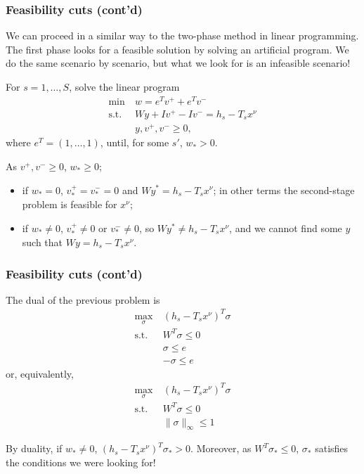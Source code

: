 \documentclass{beamer}
\begin{document}
\begin{frame}
\frametitle{Feasibility cuts (cont'd)}

We can proceed in a similar way to the two-phase method in linear programming.
The first phase looks for a feasible solution by solving an artificial program.
We do the same scenario by scenario, but what we look for is an infeasible scenario!

\mbox{}

For $s = 1,\ldots,S$, solve the linear program
\begin{align*}
\min\ & w = e^Tv^+ + e^Tv^- \\
\mbox{s.t. } & Wy + Iv^+ - Iv^- = h_s - T_sx^{\nu} \\
& y, v^+, v^- \geq 0,
\end{align*}
where $e^T = (1,\ldots,1)$, until, for some $s'$, %
$w_* > 0$.

\mbox{}

As $v^+, v^- \geq 0$, $w_* \geq 0$;
\begin{itemize}
\item 
if $w_* = 0$, $v^+_* = v^-_* = 0$ and $Wy^* = h_s - T_sx^{\nu}$; in other terms the second-stage problem is feasible for $x^{\nu}$;
\item
if $w_* \ne 0$, $v^+_* \ne 0$ or $v^-_* \ne 0$, so $Wy^* \ne h_s - T_sx^{\nu}$, and we cannot find some $y$ such that $Wy = h_s - T_sx^{\nu}$.
\end{itemize}
	
\end{frame}

\begin{frame}
\frametitle{Feasibility cuts (cont'd)}

The dual of the previous problem is
\begin{align*}
\max_{\sigma}\ & (h_s - T_sx^{\nu})^T\sigma \\
\mbox{s.t. } & W^T \sigma \leq 0 \\
& \sigma \leq e \\
& -\sigma \leq e
\end{align*}
or, equivalently,
\begin{align*}
\max_{\sigma}\ & (h_s - T_sx^{\nu})^T\sigma \\
\mbox{s.t. } & W^T \sigma \leq 0 \\
& \| \sigma \|_{\infty} \leq 1
\end{align*}

By duality, if $w_* \ne 0$, $(h_s - T_sx^{\nu})^T\sigma_* > 0$.
Moreover, as $W^T \sigma_* \leq 0$, $\sigma_*$ satisfies the conditions we were looking for!
\end{frame}
\end{document}
